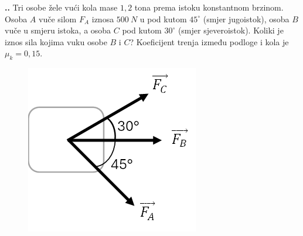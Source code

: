 

\noindent 
\textbf{
\thecjelina.\thezadatak.}
Tri osobe žele vući kola mase $1,2$ tona prema istoku konstantnom brzinom. Osoba $A$ vuče
silom $F_A$ iznosa $500\ N$ u pod kutom $45^\circ$ (smjer jugoistok), osoba $B$ vuče u smjeru istoka, a osoba $C$ pod kutom $30^\circ$ (smjer sjeveroistok). Koliki je iznos sila kojima vuku osobe $B$ i $C$? Koeficijent trenja između podloge i kola je $\mu_k=0,15$.
\begin{figure}[ht]%
  \begin{center}
    \includegraphics[scale=0.60]{../03_Dinamika_materijalne_tocke/Zadatak_D260.png}
  \end{center}
\end{figure}
